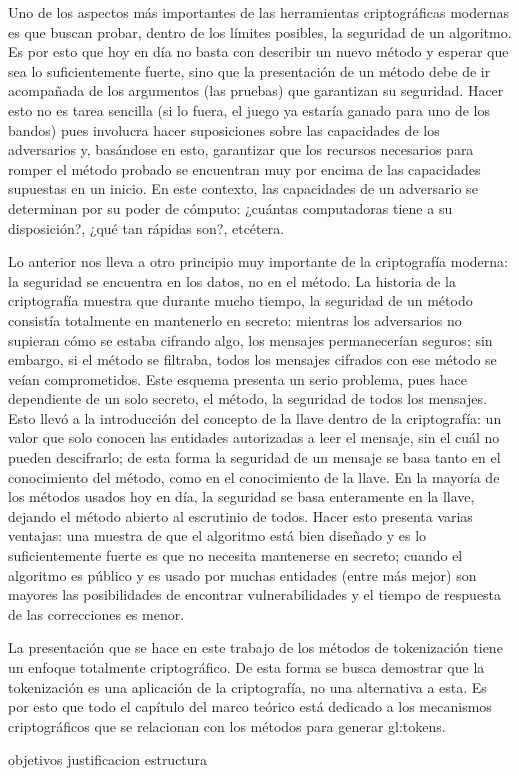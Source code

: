 Uno de los aspectos más importantes de las herramientas criptográficas
modernas es que buscan probar, dentro de los límites posibles, la
seguridad de un algoritmo. Es por esto que hoy en día no basta con
describir un nuevo método y esperar que sea lo suficientemente fuerte,
sino que la presentación de un método debe de ir acompañada de los
argumentos (las pruebas) que garantizan su seguridad. Hacer esto no es
tarea sencilla (si lo fuera, el juego ya estaría ganado para uno de los
bandos) pues involucra hacer suposiciones sobre las capacidades de
los adversarios y, basándose en esto, garantizar que los recursos necesarios
para romper el método probado se encuentran muy por encima de las capacidades
supuestas en un inicio. En este contexto, las capacidades de un adversario
se determinan por su poder de cómputo: ¿cuántas computadoras tiene a su
disposición?, ¿qué tan rápidas son?, etcétera.

Lo anterior nos lleva a otro principio muy importante de la criptografía
moderna: la seguridad se encuentra en los datos, no en el método. La historia
de la criptografía muestra que durante mucho tiempo, la seguridad de un método
consistía totalmente en mantenerlo en secreto: mientras los adversarios
no supieran cómo se estaba cifrando algo, los mensajes permanecerían seguros;
sin embargo, si el método se filtraba, todos los mensajes cifrados con ese
método se veían comprometidos. Este esquema presenta un serio problema,
pues hace dependiente de un solo secreto, el método, la seguridad de todos
los mensajes. Esto llevó a la introducción del concepto de la llave dentro
de la criptografía: un valor que solo conocen las entidades autorizadas a leer
el mensaje, sin el cuál no pueden descifrarlo; de esta forma la seguridad de un
mensaje se basa tanto en el conocimiento del método, como en el conocimiento
de la llave. En la mayoría de los métodos usados hoy en día, la seguridad se
basa enteramente en la llave, dejando el método abierto al escrutinio de todos.
Hacer esto presenta varias ventajas: una muestra de que el algoritmo está
bien diseñado y es lo suficientemente fuerte es que no necesita mantenerse en
secreto; cuando el algoritmo es público y es usado por muchas entidades (entre
más mejor) son mayores las posibilidades de encontrar vulnerabilidades y
el tiempo de respuesta de las correcciones es menor.

La presentación que se hace en este trabajo de los métodos de tokenización
tiene un enfoque totalmente criptográfico. De esta forma se busca demostrar
que la tokenización es una aplicación de la criptografía, no una alternativa
a esta. Es por esto que todo el capítulo del marco teórico está dedicado a los
mecanismos criptográficos que se relacionan con los métodos para generar
\glspl{gl:token}.

{objetivos}
{justificacion}
{estructura}
